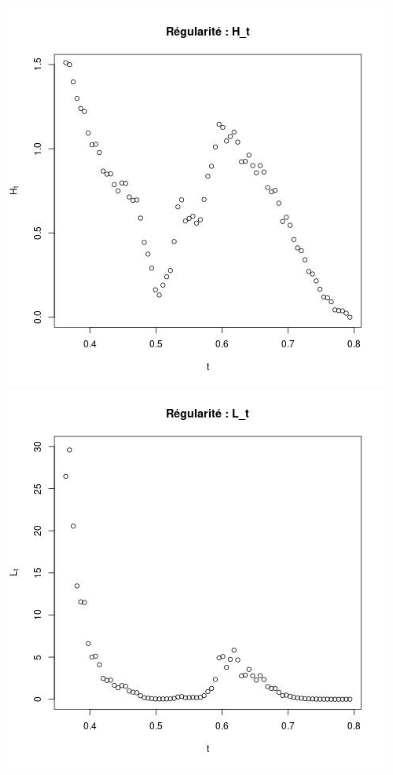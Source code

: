 \begin{figure}[H]
	\centering
	\begin{minipage}{0.48\textwidth}
	\includegraphics[width=0.89\textwidth]{Images/pv_estim/hiv_187128_Ht.jpg}
	\includegraphics[width=0.89\textwidth]{Images/pv_estim/hiv_187128_Lt.jpg}

\end{minipage}
\end{figure}

